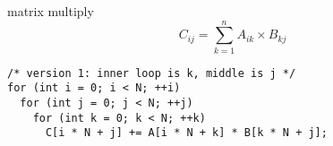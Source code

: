 \begin{frame}[fragile,label=matrixMult]{matrix multiply}
\[ C_{ij} = \sum_{k=1}^n A_{ik}\times B_{kj} \]
\lstset{language=C,style=small}
\begin{lstlisting}
/* version 1: inner loop is k, middle is j */
for (int i = 0; i < N; ++i)
  for (int j = 0; j < N; ++j)
    for (int k = 0; k < N; ++k)
      C[i * N + j] += A[i * N + k] * B[k * N + j];
\end{lstlisting}
\end{frame}
